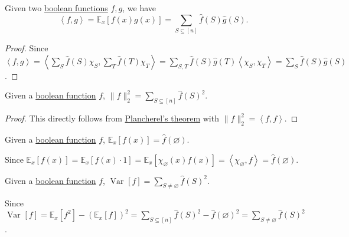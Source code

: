 \begin{theorem}\label{thm:Plancherel}
	Given two \hyperref[def:boolean-function]{boolean functions} \(f, g\), we have
	\[
		\left\langle f, g \right\rangle = \mathbb{E}_{x}\left[f(x)g(x) \right] = \sum_{S \subseteq [n]} \hat{f} (S) \hat{g} (S).
	\]
\end{theorem}
\begin{proof}
	Since \(\left\langle f, g \right\rangle
	= \left\langle \sum_{S} \hat{f} (S) \chi _S, \sum_{T} \hat{f} (T) \chi _T \right\rangle
	= \sum_{S, T} \hat{f} (S) \hat{g} (T) \left\langle \chi _S, \chi _T  \right\rangle
	= \sum_S \hat{f}(S)\hat{g}(S)\).
\end{proof}

\begin{theorem}\label{thm:Parseval}
	Given a \hyperref[def:boolean-function]{boolean function} \(f\), \(\lVert f \rVert _2^2 = \sum_{S \subseteq [n]} \hat{f} (S)^2\).
\end{theorem}
\begin{proof}
	This directly follows from \hyperref[thm:Plancherel]{Plancherel's theorem} with \(\lVert f \rVert _2^2 = \left\langle f, f \right\rangle \).
\end{proof}

\begin{claim}
	Given a \hyperref[def:boolean-function]{boolean function} \(f\), \(\mathbb{E}_{x}\left[f(x) \right] = \hat{f} (\varnothing )\).
\end{claim}
\begin{explanation}
	Since \(\mathbb{E}_{x}\left[f(x) \right]
	= \mathbb{E}_{x}\left[f(x) \cdot 1 \right]
	= \mathbb{E}_{x}\left[\chi _\varnothing (x) f(x) \right]
	= \left\langle \chi _\varnothing , f \right\rangle
	= \hat{f} (\varnothing )\).
\end{explanation}

\begin{claim}
	Given a \hyperref[def:boolean-function]{boolean function} \(f\), \(\mathop{\mathrm{Var}}\nolimits_{}\left[f \right] = \sum_{S \neq \varnothing } \hat{f} (S)^{2}  \).
\end{claim}
\begin{explanation}
	Since \(\mathop{\mathrm{Var}}\nolimits_{}\left[f \right]
	= \mathbb{E}_{x}\left[f^2 \right] - \left( \mathbb{E}_{x}\left[f \right]  \right) ^2
	= \sum_{S \subseteq [n]} \hat{f} (S)^2 - \hat{f} (\varnothing )^2
	= \sum_{S \neq \varnothing } \hat{f} (S)^2\).
\end{explanation}

